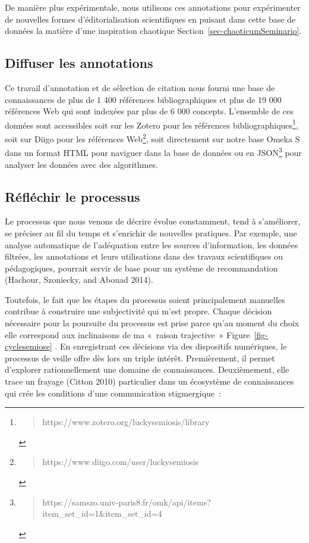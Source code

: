 \documentclass[
  letterpaper,
  DIV=11,
  numbers=noendperiod]{scrreprt}
\begin{document}
De manière plus expérimentale, nous utilisons ces annotations pour
expérimenter de nouvelles formes d'éditorialisation scientifiques en
puisant dans cette base de données la matière d'une inspiration
chaotique Section~\ref{sec-chaoticumSeminario}.

\hypertarget{sec-diffuserAnnotations}{%
\subsection{Diffuser les annotations}\label{sec-diffuserAnnotations}}

Ce travail d'annotation et de sélection de citation nous fourni une base
de connaissances de plus de 1 400 références bibliographiques et plus de
19 000 références Web qui sont indexées par plus de 6 000 concepts.
L'ensemble de ces données sont accessibles soit sur les Zotero pour les
références bibliographiques\footnote{\begin{quote}
  https://www.zotero.org/luckysemiosis/library
  \end{quote}}, soit sur Diigo pour les références Web\footnote{\begin{quote}
  https://www.diigo.com/user/luckysemiosis
  \end{quote}}, soit directement sur notre base Omeka S dans un format
HTML pour naviguer dans la base de données ou en JSON\footnote{\begin{quote}
  https://samszo.univ-paris8.fr/omk/api/items?item\_set\_id=1\&item\_set\_id=4
  \end{quote}} pour analyser les données avec des algorithmes.

\hypertarget{sec-reflechirProcessus}{%
\subsection{Réfléchir le processus}\label{sec-reflechirProcessus}}

Le processus que nous venons de décrire évolue constamment, tend à
s'améliorer, se préciser au fil du temps et s'enrichir de nouvelles
pratiques. Par exemple, une analyse automatique de l'adéquation entre
les sources d'information, les données filtrées, les annotations et
leurs utilisations dans des travaux scientifiques ou pédagogiques,
pourrait servir de base pour un système de recommandation (Hachour,
Szoniecky, and Abouad 2014).

Toutefois, le fait que les étapes du processus soient principalement
manuelles contribue à construire une subjectivité qui m'est propre.
Chaque décision nécessaire pour la poursuite du processus est prise
parce qu'au moment du choix elle correspond aux inclinaisons de ma
«~raison trajective~» Figure~\ref{fig-cyclesemiose} . En enregistrant
ces décisions via des dispositifs numériques, le processus de veille
offre dès lors un triple intérêt. Premièrement, il permet d'explorer
rationnellement une domaine de connaissances. Deuxièmement, elle trace
un frayage (Citton 2010) particulier dans un écosystème de connaissances
qui crée les conditions d'une communication stigmergique~:
\end{document}
